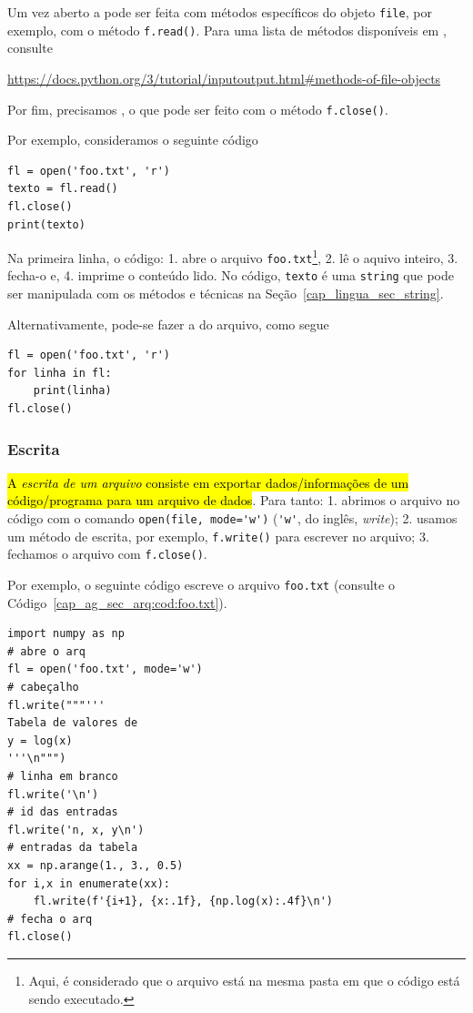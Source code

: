 Um vez aberto a  pode ser feita com métodos específicos do objeto {\lstinline+file+}, por exemplo, com o método {\lstinline+f.read()+}. Para uma lista de métodos disponíveis em {\python}, consulte
\begin{center}
  \url{https://docs.python.org/3/tutorial/inputoutput.html#methods-of-file-objects}
\end{center}
Por fim, precisamos , o que pode ser feito com o método {\lstinline+f.close()+}.

Por exemplo, consideramos o seguinte código

\begin{lstlisting}
fl = open('foo.txt', 'r')
texto = fl.read()
fl.close()
print(texto)
\end{lstlisting}

Na primeira linha, o código: 1. abre o arquivo \lstinline+foo.txt+\footnote{Aqui, é considerado que o arquivo está na mesma pasta em que o código está sendo executado.}, 2. lê o aquivo inteiro, 3. fecha-o e, 4. imprime o conteúdo lido. No código, \lstinline+texto+ é uma \lstinline+string+ que pode ser manipulada com os métodos e técnicas na Seção~\ref{cap_lingua_sec_string}.

Alternativamente, pode-se fazer a  do arquivo, como segue

\begin{lstlisting}
fl = open('foo.txt', 'r')
for linha in fl:
    print(linha)
fl.close()
\end{lstlisting}

\subsubsection{Escrita}

\hl{A \emph{escrita de um arquivo} consiste em exportar dados/informações de um código/programa para um arquivo de dados}. Para tanto: 1. abrimos o arquivo no código com o comando \lstinline+open(file, mode='w')+ (\lstinline+'w'+, do inglês, \textit{write}); 2. usamos um método de escrita, por exemplo, \lstinline+f.write()+ para escrever no arquivo; 3. fechamos o arquivo com \lstinline+f.close()+.

Por exemplo, o seguinte código escreve o arquivo \lstinline+foo.txt+ (consulte o Código~\ref{cap_ag_sec_arq:cod:foo.txt}).

\begin{lstlisting}[caption=foo.py, label=cap_ag_sec_arq:cod:foo.py]
import numpy as np
# abre o arq
fl = open('foo.txt', mode='w')
# cabeçalho
fl.write("""'''
Tabela de valores de
y = log(x)
'''\n""")
# linha em branco
fl.write('\n')
# id das entradas
fl.write('n, x, y\n')
# entradas da tabela
xx = np.arange(1., 3., 0.5)
for i,x in enumerate(xx):
    fl.write(f'{i+1}, {x:.1f}, {np.log(x):.4f}\n')
# fecha o arq
fl.close()
\end{lstlisting}

